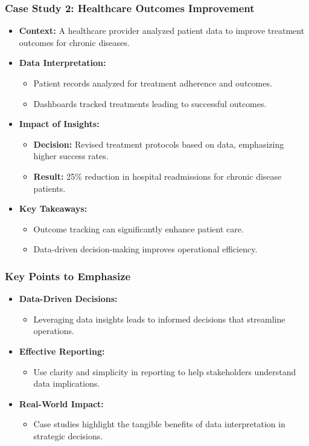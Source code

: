\documentclass[aspectratio=169]{beamer}
\begin{document}
\begin{frame}[fragile]
    \frametitle{Case Study 2: Healthcare Outcomes Improvement}
    \begin{itemize}
        \item \textbf{Context:} A healthcare provider analyzed patient data to improve treatment outcomes for chronic diseases.
        \item \textbf{Data Interpretation:}
            \begin{itemize}
                \item Patient records analyzed for treatment adherence and outcomes.
                \item Dashboards tracked treatments leading to successful outcomes.
            \end{itemize}
        \item \textbf{Impact of Insights:}
            \begin{itemize}
                \item \textbf{Decision:} Revised treatment protocols based on data, emphasizing higher success rates.
                \item \textbf{Result:} 25\% reduction in hospital readmissions for chronic disease patients.
            \end{itemize}
        \item \textbf{Key Takeaways:}
            \begin{itemize}
                \item Outcome tracking can significantly enhance patient care.
                \item Data-driven decision-making improves operational efficiency.
            \end{itemize}
    \end{itemize}
\end{frame}

\begin{frame}[fragile]
    \frametitle{Key Points to Emphasize}
    \begin{itemize}
        \item \textbf{Data-Driven Decisions:}
            \begin{itemize}
                \item Leveraging data insights leads to informed decisions that streamline operations.
            \end{itemize}
        \item \textbf{Effective Reporting:}
            \begin{itemize}
                \item Use clarity and simplicity in reporting to help stakeholders understand data implications.
            \end{itemize}
        \item \textbf{Real-World Impact:}
            \begin{itemize}
                \item Case studies highlight the tangible benefits of data interpretation in strategic decisions.
            \end{itemize}
    \end{itemize}
\end{frame}
\end{document}
